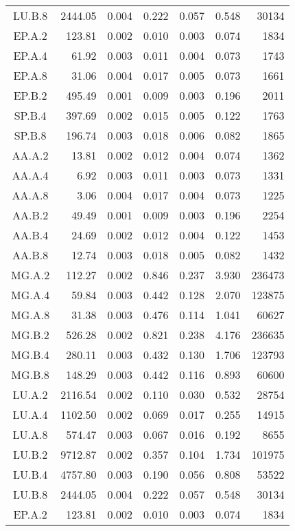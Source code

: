 \begin{ThreePartTable}
\begin{longtable}[c]{c*{6}{r}}
    LU.B.8 & 2444.05 & 0.004 & 0.222          & 0.057 & 0.548 & 30134  \\
    EP.A.2 & 123.81  & 0.002 & 0.010          & 0.003 & 0.074 & 1834   \\
    EP.A.4 & 61.92   & 0.003 & 0.011          & 0.004 & 0.073 & 1743   \\
    EP.A.8 & 31.06   & 0.004 & 0.017          & 0.005 & 0.073 & 1661   \\
    EP.B.2 & 495.49  & 0.001 & 0.009          & 0.003 & 0.196 & 2011   \\
    SP.B.4 & 397.69  & 0.002 & 0.015          & 0.005 & 0.122 & 1763   \\
    SP.B.8 & 196.74  & 0.003 & 0.018          & 0.006 & 0.082 & 1865   \\
    AA.A.2 & 13.81   & 0.002 & 0.012          & 0.004 & 0.074 & 1362   \\
    AA.A.4 & 6.92    & 0.003 & 0.011          & 0.003 & 0.073 & 1331   \\
    AA.A.8 & 3.06    & 0.004 & 0.017          & 0.004 & 0.073 & 1225   \\
    AA.B.2 & 49.49   & 0.001 & 0.009          & 0.003 & 0.196 & 2254   \\
    AA.B.4 & 24.69   & 0.002 & 0.012          & 0.004 & 0.122 & 1453   \\
    AA.B.8 & 12.74   & 0.003 & 0.018          & 0.005 & 0.082 & 1432   \\
    MG.A.2 & 112.27  & 0.002 & 0.846          & 0.237 & 3.930 & 236473 \\
    MG.A.4 & 59.84   & 0.003 & 0.442          & 0.128 & 2.070 & 123875 \\
    MG.A.8 & 31.38   & 0.003 & 0.476          & 0.114 & 1.041 & 60627  \\
    MG.B.2 & 526.28  & 0.002 & 0.821          & 0.238 & 4.176 & 236635 \\
    MG.B.4 & 280.11  & 0.003 & 0.432          & 0.130 & 1.706 & 123793 \\
    MG.B.8 & 148.29  & 0.003 & 0.442          & 0.116 & 0.893 & 60600  \\
    LU.A.2 & 2116.54 & 0.002 & 0.110          & 0.030 & 0.532 & 28754  \\
    LU.A.4 & 1102.50 & 0.002 & 0.069          & 0.017 & 0.255 & 14915  \\
    LU.A.8 & 574.47  & 0.003 & 0.067          & 0.016 & 0.192 & 8655   \\
    LU.B.2 & 9712.87 & 0.002 & 0.357          & 0.104 & 1.734 & 101975 \\
    LU.B.4 & 4757.80 & 0.003 & 0.190          & 0.056 & 0.808 & 53522  \\
    LU.B.8 & 2444.05 & 0.004 & 0.222          & 0.057 & 0.548 & 30134  \\
    EP.A.2 & 123.81  & 0.002 & 0.010          & 0.003 & 0.074 & 1834   \\
    \bottomrule
  \end{longtable}
\end{ThreePartTable}



